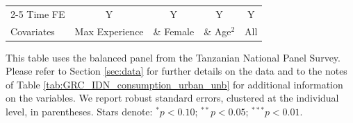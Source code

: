 \begin{table}[htbp]
\begin{threeparttable}
\begin{tabular}{l cccc}
\cmidrule{2-5} Time FE & Y & Y & Y & Y \\ Covariates & Max Experience & \& Female & \& Age$^2$ & All \\ \bottomrule \end{tabular} \begin{tablenotes}[flushleft] \footnotesize \item{This table uses the balanced panel from the Tanzanian National Panel Survey. Please refer to Section \ref{sec:data} for further details on the data and to the notes of Table \ref{tab:GRC_IDN_consumption_urban_unb} for additional information on the variables. We report robust standard errors, clustered at the individual level, in parentheses. Stars denote: $^{*} p<0.10$; $^{**} p<0.05$; $^{***} p<0.01$.} \end{tablenotes} \end{threeparttable} \end{table}
